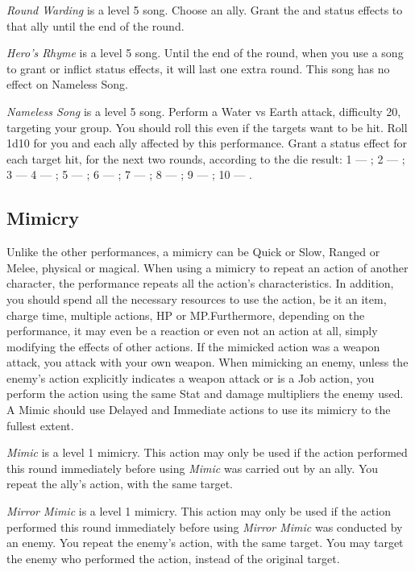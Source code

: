 \begin{multicols}{2}
    \textit{Round Warding} is a level 5 song. Choose an ally. Grant the  and  status effects to that ally until the end of the round.
    
	\textit{Hero's Rhyme} is a level 5 song. Until the end of the round, when you use a song to grant or inflict status effects, it will last one extra round. This song has no effect on Nameless Song.
    
    \textit{Nameless Song} is a level 5 song. Perform a Water vs Earth attack, difficulty 20, targeting your group. You should roll this even if the targets want to be hit. Roll 1d10 for you and each ally affected by this performance. Grant a status effect for each target hit, for the next two rounds, according to the die result: 1 --- ; 2 --- ; 3 ---  4 --- ; 5 --- ; 6 --- ; 7 --- ; 8 --- ; 9 --- ; 10 --- .
 
    \subsection{Mimicry}\label{subsec:perf-mimicry}

	Unlike the other performances, a mimicry can be Quick or Slow, Ranged or Melee, physical or magical. When using a mimicry to repeat an action of another character, the performance repeats all the action’s characteristics. In addition, you should spend all the necessary resources to use the action, be it an item, charge time, multiple actions, HP or MP.\@{}Furthermore, depending on the performance, it may even be a reaction or even not an action at all, simply modifying the effects of other actions. If the mimicked action was a weapon attack, you attack with your own weapon. When mimicking an enemy, unless the enemy's action explicitly indicates a weapon attack or is a Job action, you perform the action using the same Stat and damage multipliers the enemy used. A Mimic should use Delayed and Immediate actions to use its mimicry to the fullest extent.
    
    \textit{Mimic}  is a level 1 mimicry. This action may only be used if the action performed this round immediately before using \textit{Mimic} was carried out by an ally. You repeat the ally’s action, with the same target.
    
    \textit{Mirror Mimic} is a level 1 mimicry. This action may only be used if the action performed this round immediately before using \textit{Mirror Mimic} was conducted by an enemy. You repeat the enemy’s action, with the same target. You may target the enemy who performed the action, instead of the original target. 
    

\end{multicols}
